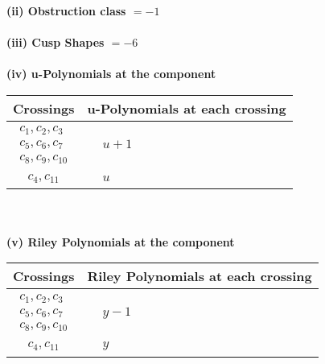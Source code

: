 \documentclass[1p]{elsarticle_modified}
\theoremstyle{definition}
\begin{document}
\flushleft \textbf{(ii) Obstruction class $= -1$}\\~\\
\flushleft \textbf{(iii) Cusp Shapes $= -6$}\\~\\
\newpage\renewcommand{\arraystretch}{1}
\flushleft \textbf{(iv) u-Polynomials at the component}\newline \\
\begin{tabular}{m{50pt}|m{274pt}}
Crossings & \hspace{64pt}u-Polynomials at each crossing \\
\hline $$\begin{aligned}c_{1},c_{2},c_{3}\\c_{5},c_{6},c_{7}\\c_{8},c_{9},c_{10}\end{aligned}$$&$\begin{aligned}
&u+1
\end{aligned}$\\
\hline $$\begin{aligned}c_{4},c_{11}\end{aligned}$$&$\begin{aligned}
&u
\end{aligned}$\\
\hline
\end{tabular}\\~\\
\newpage\renewcommand{\arraystretch}{1}
\flushleft \textbf{(v) Riley Polynomials at the component}\newline \\
\begin{tabular}{m{50pt}|m{274pt}}
Crossings & \hspace{64pt}Riley Polynomials at each crossing \\
\hline $$\begin{aligned}c_{1},c_{2},c_{3}\\c_{5},c_{6},c_{7}\\c_{8},c_{9},c_{10}\end{aligned}$$&$\begin{aligned}
&y-1
\end{aligned}$\\
\hline $$\begin{aligned}c_{4},c_{11}\end{aligned}$$&$\begin{aligned}
&y
\end{aligned}$\\
\hline
\end{tabular}\\~\\
\end{document}
